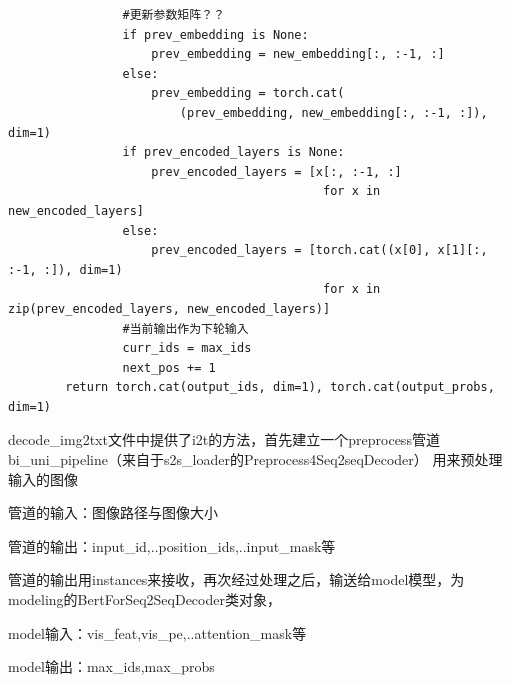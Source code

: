 \documentclass[a4paper]{article}
\begin{document}
\begin{sloppypar}
\begin{lstlisting}
                #更新参数矩阵？？
                if prev_embedding is None:
                    prev_embedding = new_embedding[:, :-1, :]
                else:
                    prev_embedding = torch.cat(
                        (prev_embedding, new_embedding[:, :-1, :]), dim=1)
                if prev_encoded_layers is None:
                    prev_encoded_layers = [x[:, :-1, :]
                                            for x in new_encoded_layers]
                else:
                    prev_encoded_layers = [torch.cat((x[0], x[1][:, :-1, :]), dim=1)
                                            for x in zip(prev_encoded_layers, new_encoded_layers)]
                #当前输出作为下轮输入
                curr_ids = max_ids
                next_pos += 1
        return torch.cat(output_ids, dim=1), torch.cat(output_probs, dim=1)

    \end{lstlisting}
    decode\_img2txt文件中提供了i2t的方法，首先建立一个preprocess管道bi\_uni\_pipeline（来自于s2s\_loader的Preprocess4Seq2seqDecoder）
    用来预处理输入的图像

    管道的输入：图像路径与图像大小

    管道的输出：input\_id,..position\_ids,..input\_mask等

    管道的输出用instances来接收，再次经过处理之后，输送给model模型，为modeling的BertForSeq2SeqDecoder类对象，

    model输入：vis\_feat,vis\_pe,..attention\_mask等

    model输出：max\_ids,max\_probs


\end{sloppypar}
\end{document}

